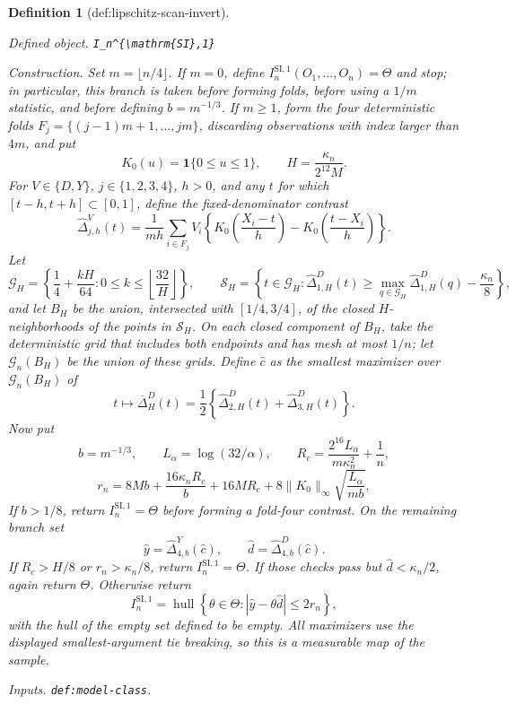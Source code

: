 \documentclass{article}
\newtheorem{definition}{Definition}
\begin{document}
\begin{definition}[def:lipschitz-scan-invert]\label{def:lipschitz-scan-invert}
\par\smallskip\noindent\emph{Defined object.} \texttt{I\_\allowbreak{}n\textasciicircum{}\{\textbackslash{}\allowbreak{}mathrm\{SI\}\allowbreak{},\allowbreak{}1\}\allowbreak{}}
\par\smallskip\noindent\emph{Construction.} Set \(m=\lfloor n/4\rfloor\).  If \(m=0\), define
\(I_n^{\mathrm{SI},1}(O_1,\ldots,O_n)=\Theta\) and stop; in
particular, this branch is taken before forming folds, before using a
\(1/m\) statistic, and before defining \(b=m^{-1/3}\).  If \(m\ge1\),
form the four deterministic folds
\(F_j=\{(j-1)m+1,\ldots,jm\}\), discarding observations with index
larger than \(4m\), and put
\[
 K_0(u)=\mathbf 1\{0\le u\le1\},\qquad
 H=\frac{\kappa_n}{2^{12}M}.
\]
For \(V\in\{D,Y\}\), \(j\in\{1,2,3,4\}\), \(h>0\), and any
\(t\) for which \([t-h,t+h]\subset[0,1]\), define the fixed-denominator
contrast
\[
 \widehat\Delta_{j,h}^{V}(t)
 =\frac1{mh}\sum_{i\in F_j}V_i
 \left\{K_0\!\left(\frac{X_i-t}{h}\right)
       -K_0\!\left(\frac{t-X_i}{h}\right)\right\}.
\]
Let
\[
 \mathcal G_H=\left\{\frac14+\frac{kH}{64}:
 0\le k\le\left\lfloor\frac{32}{H}\right\rfloor\right\},
 \qquad
 \mathcal S_H=\left\{t\in\mathcal G_H:
 \widehat\Delta_{1,H}^{D}(t)
 \ge\max_{q\in\mathcal G_H}\widehat\Delta_{1,H}^{D}(q)
       -\frac{\kappa_n}{8}\right\},
\]
and let \(B_H\) be the union, intersected with \([1/4,3/4]\), of the
closed \(H\)-neighborhoods of the points in \(\mathcal S_H\).  On each
closed component of \(B_H\), take the deterministic grid that includes
both endpoints and has mesh at most \(1/n\); let \(\mathcal G_n(B_H)\)
be the union of these grids.  Define \(\widehat c\) as the smallest
maximizer over \(\mathcal G_n(B_H)\) of
\[
 t\longmapsto
 \overline\Delta_H^D(t)
 =\frac12\left\{\widehat\Delta_{2,H}^{D}(t)
                 +\widehat\Delta_{3,H}^{D}(t)\right\}.
\]
Now put
\[
 b=m^{-1/3},\qquad L_\alpha=\log(32/\alpha),\qquad
 R_c=\frac{2^{16}L_\alpha}{m\kappa_n^2}+\frac1n,
\]
\[
 r_n=8Mb+\frac{16\kappa_nR_c}{b}+16MR_c
     +8\|K_0\|_\infty\sqrt{\frac{L_\alpha}{mb}},
\]
If \(b>1/8\), return \(I_n^{\mathrm{SI},1}=\Theta\) before forming a
fold-four contrast.  On the remaining branch set
\[
 \widehat y=\widehat\Delta_{4,b}^{Y}(\widehat c),
 \qquad
 \widehat d=\widehat\Delta_{4,b}^{D}(\widehat c).
\]
If \(R_c>H/8\) or \(r_n>\kappa_n/8\), return
\(I_n^{\mathrm{SI},1}=\Theta\).  If those checks pass but
\(\widehat d<\kappa_n/2\), again return \(\Theta\).  Otherwise return
\[
 I_n^{\mathrm{SI},1}
 =\operatorname{hull}\left\{\theta\in\Theta:
       |\widehat y-\theta\widehat d|\le2r_n\right\},
\]
with the hull of the empty set defined to be empty.  All maximizers use
the displayed smallest-argument tie breaking, so this is a measurable
map of the sample.
\par\smallskip\noindent\emph{Inputs.} \texttt{def:\allowbreak{}model-\allowbreak{}class}.
\end{definition}
\end{document}

